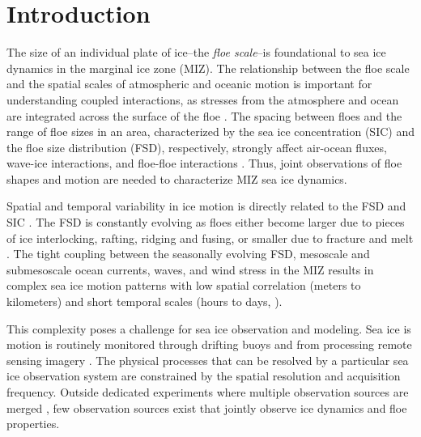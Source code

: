 \documentclass[aog]{igs}
\begin{document}
\section{Introduction}
The size of an individual plate of ice--the \emph{floe scale}--is foundational to sea ice dynamics in the marginal ice zone (MIZ).
The relationship between the floe scale and the spatial scales of atmospheric and oceanic motion is important for understanding coupled interactions, as stresses from the atmosphere and ocean are integrated across the surface of the floe \citep{brenner2023_ScaleDependentAirSea,
gupta2024_EddyInducedDispersion,
kim2024_CharacterizationSea}. The spacing between floes and the range of floe sizes in an area, characterized by the sea ice concentration (SIC) and the floe size distribution (FSD), respectively, strongly affect air-ocean fluxes, wave-ice interactions, and floe-floe interactions \citep{Mcnutt2003, loose2014_ParameterModel, wenta2018_InfluenceSpatial, horvat2022_FloesMarginal, herman2022_GranularEffects, manucharyan2022_SpinningIce, brenner2024_ScalingSimulations}.
Thus, joint observations of floe shapes and motion are needed to characterize MIZ sea ice dynamics.

Spatial and temporal variability in ice motion is directly related to the FSD and SIC \citep{overland1995_HierarchySea, dumont2022_MarginalIce,
herman2022_GranularEffects}.
The FSD is constantly evolving as floes either become larger due to pieces of ice interlocking, rafting, ridging and fusing, or smaller  due to fracture and melt \citep{zhang2015_SeaIce, horvat2016_InteractionSea, bateson2020_ImpactSea, roach2024_PhysicsSeasonal}.
The tight coupling between the seasonally evolving FSD, mesoscale and submesoscale ocean currents, waves, and wind stress in the MIZ results in complex sea ice motion patterns with low spatial correlation (meters to kilometers) and short temporal scales (hours to days, \cite{hakkinen1987_FeedbackIce, johannessen1987_MesoscaleEddies,
johannessen1987_IceEdgeEddies, feltham2005_GranularFlow,  cole2017_IceOcean, watkins2023_EvidenceAbrupt}).

This complexity poses a challenge for sea ice observation and modeling.
Sea ice is motion is routinely monitored through drifting buoys and from processing remote sensing imagery \citep{webster2022_ObservingArctic, gerland2019_EssentialGaps, sandvenSeaIceRemote2023}.
The physical processes that can be resolved by a particular sea ice observation system are constrained by the spatial resolution and acquisition frequency.
Outside dedicated experiments where multiple observation sources are merged \citep[][e.g.]{uttal2002_SHEBA, hwang2017_WintertosummerTransition, rabe2024_MOSAiCDistributed}, few observation sources exist that jointly observe ice dynamics and floe properties. 
\end{document}
